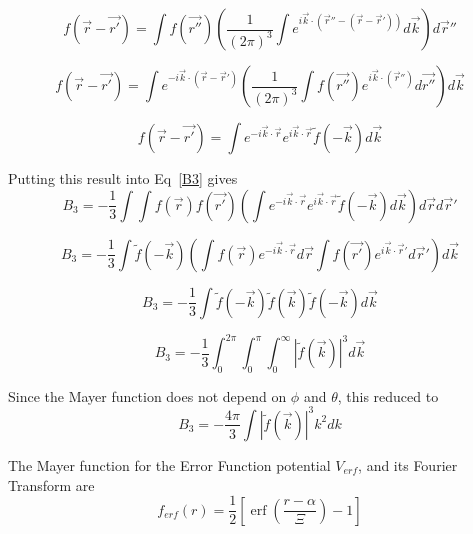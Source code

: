 \documentclass[12pt]{article}
\begin{document}
\begin{equation}f(\vec{r}-\vec{r'})=\int{f(\vec{r''})\left( \frac{1}{\left(2\pi\right)^3}\int e^{i\vec k\cdot (\vec{r}''-(\vec r-\vec r'))}d\vec{k} \right) d\vec r''} \end{equation}

\begin{equation}f(\vec{r}-\vec{r'})=\int{ e^{-i\vec k\cdot (\vec r-\vec r')}\left(\frac{1}{\left(2\pi\right)^3}\int{f(\vec{r''}) e^{i\vec k\cdot (\vec{r}'')}d\vec{r''}} \right) d\vec k} \end{equation}

\begin{equation}f(\vec{r}-\vec{r'})=\int{ e^{-i\vec k\cdot \vec r}e^{i\vec k\cdot \vec r}\widetilde{f}(-\vec k) d\vec k} \end{equation}

Putting this result into Eq~\ref{B3} gives
\begin{equation}B_3=-\frac{1}{3}\int{\int{f(\vec{r})f(\vec{r'})\left(\int{ e^{-i\vec k\cdot \vec r}e^{i\vec k\cdot \vec r}\widetilde{f}(-\vec k) d\vec k}\right)d\vec rd\vec r'}}\end{equation}

\begin{equation}B_3=-\frac{1}{3}\int{\widetilde{f}(-\vec k)\left(\int{f(\vec{r})e^{-i\vec k\cdot \vec r}}d\vec r\int{f(\vec{r'})e^{i\vec k\cdot \vec r'} d\vec r'}\right)d\vec k}\end{equation}

\begin{equation}B_3=-\frac{1}{3}\int{\widetilde{f}(-\vec k)\widetilde{f}(\vec k)\widetilde{f}(-\vec k)d\vec k}\end{equation}

\begin{equation}B_3=-\frac{1}{3}\int_0^{2\pi}\int_0^{\pi}\int_0^{\infty}{|\widetilde{f}(\vec k)|^3d\vec k}\end{equation}

Since the Mayer function does not depend on $\phi$ and $\theta$, this reduced to
\begin{equation}B_3=-\frac{4\pi}{3}\int{|\widetilde{f}(\vec k)|^3k^2dk}\end{equation}

The Mayer function for the Error Function potential $V_{erf}$, and its Fourier Transform are
\begin{equation}f_{erf}(r)=\frac{1}{2}\left[\operatorname{erf}\left(\frac{r-\alpha}{\Xi}\right)-1\right]\end{equation} 
\end{document}
